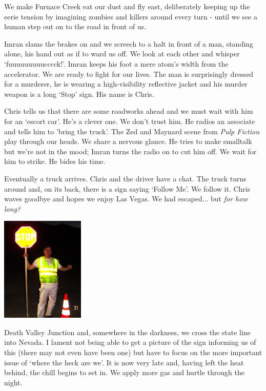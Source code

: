 \documentclass[a5paper,titlepage,11pt]{book}
\begin{document}
We make Furnace Creek eat our dust and fly east, deliberately keeping up the eerie tension by imagining zombies and killers around every turn - until we see a human step out on to the road in front of us.

Imran slams the brakes on and we screech to a halt in front of a man, standing alone, his hand out as if to ward us off.  We look at each other and whisper `fuuuuuuuuucccck!'.  Imran keeps his foot a mere atom's width from the accelerator.  We are ready to fight for our lives.  The man is surprisingly dressed for a murderer, he is wearing a high-visibility reflective jacket and his murder weapon is a long `Stop' sign.  His name is Chris.

Chris tells us that there are some roadworks ahead and we must wait with him for an `escort car'.  He's a clever one.  We don't trust him.  He radios an associate and tells him to 'bring the truck'.  The Zed and Maynard scene from \emph{Pulp Fiction} play through our heads.  We share a nervous glance.  He tries to make smalltalk but we're not in the mood; Imran turns the radio on to cut him off.  We wait for him to strike.  He bides his time.

Eventually a truck arrives.  Chris and the driver have a chat.  The truck turns around and, on its back, there is a sign saying `Follow Me'.  We follow it.  Chris waves goodbye and hopes we enjoy Las Vegas.  We had escaped... but \emph{for how long?}

\begin{center}\includegraphics[height=50mm]{gfx/DSC00683}\end{center}

Death Valley Junction and, somewhere in the darkness, we cross the state line into Nevada.  I lament not being able to get a picture of the sign informing us of this (there may not even have been one) but have to focus on the more important issue of `where the heck are we'.  It is now very late and, having left the heat behind, the chill begins to set in.  We apply more gas and hurtle through the night.
\end{document}
